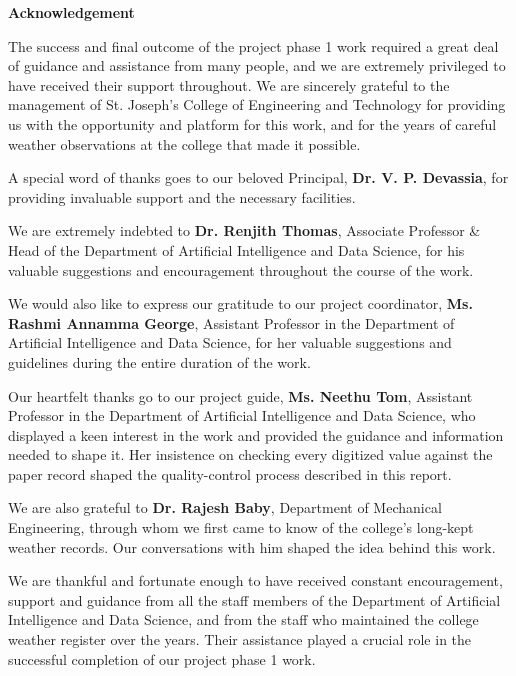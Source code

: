 \newpage
\thispagestyle{empty}
\begin{center}
  \vspace*{1cm}
  \textbf{\large Acknowledgement}
\end{center}

The success and final outcome of the project phase 1 work required a great deal of guidance and assistance from many people, and we are extremely privileged to have received their support throughout. We are sincerely grateful to the management of St. Joseph’s College of Engineering and Technology for providing us with the opportunity and platform for this work, and for the years of careful weather observations at the college that made it possible.

A special word of thanks goes to our beloved Principal, \textbf{Dr. V. P. Devassia}, for providing invaluable support and the necessary facilities.

We are extremely indebted to \textbf{Dr. Renjith Thomas}, Associate Professor \& Head of the Department of Artificial Intelligence and Data Science, for his valuable suggestions and encouragement throughout the course of the work.

We would also like to express our gratitude to our project coordinator, \textbf{Ms. Rashmi Annamma George}, Assistant Professor in the Department of Artificial Intelligence and Data Science, for her valuable suggestions and guidelines during the entire duration of the work.

Our heartfelt thanks go to our project guide, \textbf{Ms. Neethu Tom}, Assistant Professor in the Department of Artificial Intelligence and Data Science, who displayed a keen interest in the work and provided the guidance and information needed to shape it. Her insistence on checking every digitized value against the paper record shaped the quality-control process described in this report.

We are also grateful to \textbf{Dr. Rajesh Baby}, Department of Mechanical Engineering, through whom we first came to know of the college's long-kept weather records. Our conversations with him shaped the idea behind this work.

We are thankful and fortunate enough to have received constant encouragement, support and guidance from all the staff members of the Department of Artificial Intelligence and Data Science, and from the staff who maintained the college weather register over the years. Their assistance played a crucial role in the successful completion of our project phase 1 work.



